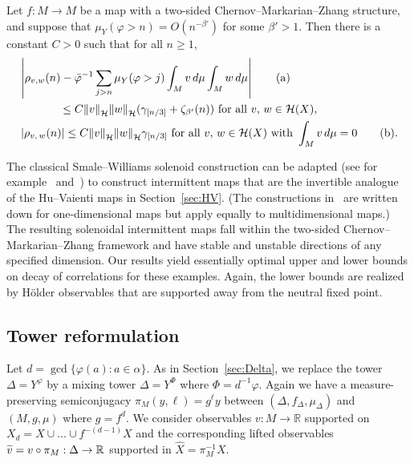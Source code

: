 \documentclass[AHL,Unicode,longabstracts,published]{cedram}
\newcommand{\R}{\mathbb{R}}
\newcommand{\cH}{\mathcal{H}}
\newcommand{\hX}{\widehat{X}}
\newcommand{\tv}{\tilde{v}}
\newcommand{\bvarphi}{\bar{\varphi}}
\newcommand*{\alphenumi}{\renewcommand*{\theenumi}{\alph{enumi}}}
\let\oldtilde\tilde
\renewcommand*{\tilde}[1]{\mathchoice{\widetilde{#1}}{\widetilde{#1}}{\oldtilde{#1}}{\oldtilde{#1}}}
\begin{document}
\begin{theo} \label{thm:main2}
Let $f:M\to M$ be a map with a two-sided Chernov--Marka\-rian--Zhang structure, and suppose that $\mu_Y(\varphi>n)=O(n^{-\beta'})$ for some $\beta'>1$. Then there is a constant $C>0$ such that for all $n\ge1$,
\begin{align}
&\left|\rho_{v,w}(n)-\bvarphi^{-1}\sum_{j>n} \mu_Y(\varphi>j)\int_Mv\,d\mu\int_Mw\,d\mu\right|\tag{${\rm a}$}\label{theo7.4.1}\\
&\mkern65mu\le C{\|v\|}_{\cH}{\|w\|}_{\cH}(\gamma_{[n/3]}+\zeta_{\beta'}(n))\text{ for all }v,\,w\in \cH(X),\nonumber\\
&\left|\rho_{v,\,w}(n)\right|\le C{\|v\|}_{\cH}{\|w\|}_\cH\gamma_{[n/3]}\text{ for all }v,\,w\in \cH(X)\text{ with }\int_M v\,d\mu=0\tag{${\rm b}$}\label{theo7.4.2}.
\end{align}
\end{theo}

\begin{rema}\label{rmk:NUH}
The classical Smale--Williams solenoid construction can be adap\-ted (see for example~\cite[Section~5]{AlvesPinheiro08} and~\cite[Example~4.2]{MV16}) to construct intermittent maps that are the invertible analogue of the Hu--Vaienti maps in Section~\ref{sec:HV}. (The constructions in~\cite{AlvesPinheiro08,MV16} are written down for one-dimensional maps but apply equally to multidimensional maps.) The resulting solenoidal intermittent maps fall within the two-sided Chernov--Markarian--Zhang framework and have stable and unstable directions of any specified dimension. Our results yield essentially optimal upper and lower bounds on decay of correlations for these examples. Again, the lower bounds are realized by H\"older observables that are supported away from the neutral fixed point.
\end{rema}


\subsection{Tower reformulation}\label{sec:Delta2}
Let $d=\gcd\{\varphi(a):a\in\alpha\}$. As in Section~\ref{sec:Delta}, we replace the tower $\Delta=Y^\varphi$ by a mixing tower $\Delta=Y^\Phi$ where $\Phi=d^{-1}\varphi$. Again we have a measure-preserving semiconjugacy $\pi_M(y,\ell)=g^\ell y$ between $(\Delta,f_\Delta,\mu_\Delta)$ and $(M,g,\mu)$ where $g=f^d$. We consider observables $v:M\to\R$ supported on $X_d=X\cup\dots\cup f^{-(d-1)}X$ and the corresponding lifted observables $\tv=v\circ\pi_M:\Delta\to\R$ supported in $\hX=\pi_M^{-1}X$.
\end{document}

